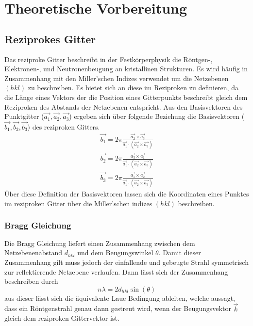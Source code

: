 \section{Theoretische Vorbereitung}
    \subsection{Reziprokes Gitter}
        Das reziproke Gitter beschreibt in der Festkörperphysik die Röntgen-, Elektronen-, und Neutronenbeugung
        an kristallinen Strukturen. Es wird häufig in Zusammenhang mit den Miller'schen Indizes verwendet
        um die Netzebenen $(hkl)$ zu beschreiben. Es bietet sich an diese im Reziproken zu definieren, da die Länge
        eines Vektors der die Position eines Gitterpunkts beschreibt gleich dem Reziproken des Abstands der
        Netzebenen entspricht.
        Aus den Basisvektoren des Punktgitter ($\vec{a_1},\vec{a_2},\vec{a_3}$) ergeben sich über folgende Beziehung
        die Basisvektoren ($\vec{b_1},\vec{b_2},\vec{b_3}$) des reziproken Gitters.
        \begin{align*}
            \vec{b_1} = 2\pi \frac{\vec{a_2}\times \vec{a_3}}{\vec{a_1}\cdot (\vec{a_2}\times \vec{a_3})}
            \\\vec{b_2} = 2\pi \frac{\vec{a_3}\times \vec{a_1}}{\vec{a_1}\cdot (\vec{a_2}\times \vec{a_3})}
            \\\vec{b_3} = 2\pi \frac{\vec{a_1}\times \vec{a_2}}{\vec{a_1}\cdot (\vec{a_2}\times \vec{a_3})}
        \end{align*}
        Über diese Definition der Basisvektoren lassen sich die Koordinaten eines Punktes im reziproken Gitter
        über die Miller'schen indizes $(hkl)$ beschreiben.
        
        \subsubsection*{Bragg Gleichung}
            Die Bragg Gleichung liefert einen Zusammenhang zwischen dem Netzebenenabstand $d_{hkl}$ und dem
            Beugungswinkel $\theta$. Damit dieser Zusammenhang gilt muss jedoch der einfallende und gebeugte
            Strahl symmetrisch zur reflektierende Netzebene verlaufen. Dann lässt sich der Zusammenhang beschreiben durch
            \begin{equation}
                n\lambda = 2d_{hkl} \sin(\theta)
            \end{equation}
            aus dieser lässt sich die äquivalente Laue Bedingung ableiten, welche aussagt,
            dass ein Röntgenstrahl genau dann gestreut wird, wenn der Beugungsvektor $\vec{k}$ gleich dem
            reziproken Gittervektor ist. 
    
